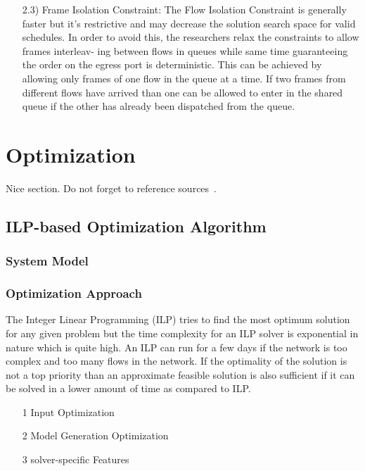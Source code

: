 \documentclass[conference]{IEEEtran}
\begin{document}
\begin{itemize}
\begin{itemize}
        \item[2.3)] Frame Isolation Constraint: The Flow Isolation Constraint is generally faster but it’s restrictive and may decrease the solution search space for valid schedules. In order to avoid this, the researchers relax the constraints to allow frames interleav- ing between flows in queues while same time guaranteeing the order on the egress port is deterministic. This can be achieved by allowing only frames of one flow in the queue at a time. If two frames from different flows have arrived than one can be allowed to enter in the shared queue if the other has already been dispatched from the queue.
    \end{itemize}
\end{itemize}

\section{Optimization}
Nice section. Do not forget to reference sources~. 
\subsection{ILP-based Optimization Algorithm}
\subsubsection{System Model}

\subsubsection{Optimization Approach}
The Integer Linear Programming (ILP) tries to find the most optimum solution for any given problem but the time complexity for an ILP solver is exponential in nature which is quite high. An ILP can run for a few days if the network is too complex and too many flows in the network. If the optimality of the solution is not a top priority than an approximate feasible solution is also sufficient if it can be solved in a lower amount of time as compared to ILP.
\begin{itemize}
    \item[1] Input Optimization
    \item[2] Model Generation Optimization
    \item[3] solver-specific Features
\end{itemize}
\end{document}
